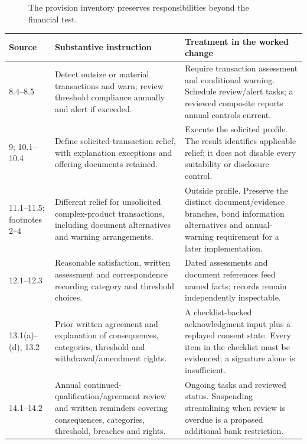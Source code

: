 \begingroup\normalsize
\begin{figure}[H]
\centering
{}
\caption{The provision inventory preserves responsibilities beyond the financial test.}\label{fig:gap-spi-dispositions}
\end{figure}

\endgroup
\begin{longtable}{P{0.14\textwidth}P{0.37\textwidth}P{0.39\textwidth}}

\toprule Source & Substantive instruction & Treatment in the worked change \\\midrule
\endhead
8.4--8.5 & Detect outsize or material transactions and warn; review threshold compliance annually and alert if exceeded. & Require transaction assessment and conditional warning. Schedule review/alert tasks; a reviewed composite reports annual controls current.\\
9; 10.1--10.4 & Define solicited-transaction relief, with explanation exceptions and offering documents retained. & Execute the solicited profile. The result identifies applicable relief; it does not disable every suitability or disclosure control.\\
11.1--11.5; footnotes 2--4 & Different relief for unsolicited complex-product transactions, including document alternatives and warning arrangements. & Outside profile. Preserve the distinct document/evidence branches, bond information alternatives and annual-warning requirement for a later implementation.\\
12.1--12.3 & Reasonable satisfaction, written assessment and correspondence recording category and threshold choices. & Dated assessments and document references feed named facts; records remain independently inspectable.\\
13.1(a)--(d), 13.2 & Prior written agreement and explanation of consequences, categories, threshold and withdrawal/amendment rights. & A checklist-backed acknowledgment input plus a replayed consent state. Every item in the checklist must be evidenced; a signature alone is insufficient.\\
14.1--14.2 & Annual continued-qualification/agreement review and written reminders covering consequences, categories, threshold, breaches and rights. & Ongoing tasks and reviewed status. Suspending streamlining when review is overdue is a proposed additional bank restriction.\\

\end{longtable}
